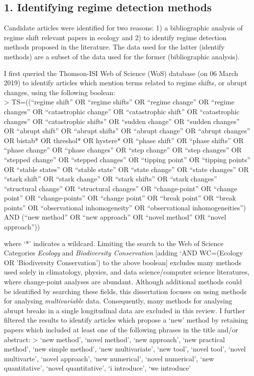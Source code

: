 \documentclass[12pt,twoside,openany]{reedthesis}
\begin{document}
\hypertarget{identifying-regime-detection-methods}{%
\subsection{1. Identifying regime detection methods}\label{identifying-regime-detection-methods}}

Candidate articles were identified for two reasons: 1) a bibliographic analysis of regime shift relevant papers in ecology and 2) to identify regime detection methods proposed in the literature. The data used for the latter (identify methods) are a subset of the data used for the former (bibliographic analysis).

I first queried the Thomson-ISI Web of Science (WoS) database (on 06 March 2019) to identify articles which mention terms related to regime shifts, or abrupt changes, using the following boolean:\\
\textgreater{} TS=((``regime shift'' OR ``regime shifts'' OR ``regime change'' OR ``regime changes'' OR ``catastrophic change'' OR ``catastrophic shift'' OR ``catastrophic changes'' OR ``catastrophic shifts'' OR ``sudden change'' OR ``sudden changes'' OR ``abrupt shift'' OR ``abrupt shifts'' OR ``abrupt change'' OR ``abrupt changes'' OR bistab* OR threshol* OR hystere* OR ``phase shift'' OR ``phase shifts'' OR ``phase change'' OR ``phase changes'' OR ``step change'' OR ``step changes'' OR ``stepped change'' OR ``stepped changes'' OR ``tipping point'' OR ``tipping points'' OR ``stable states'' OR ``stable state'' OR ``state change'' OR ``state changes'' OR ``stark shift'' OR ``stark change'' OR ``stark shifts'' OR ``stark changes'' ``structural change'' OR ``structural changes'' OR ``change-point'' OR ``change point'' OR ``change-points'' OR ``change point'' OR ``break point'' OR ``break points'' OR ``observational inhomogeneity'' OR ``observational inhomogeneities'') AND (``new method'' OR ``new approach'' OR ``novel method'' OR ``novel approach''))

where `*' indicates a wildcard. Limiting the search to the Web of Science Categories \emph{Ecology} and \emph{Biodiversity Conservation} {[}adding `AND WC=(Ecology OR 'Biodiversity Conservation') to the above boolean{]} excludes many methods used solely in climatology, physics, and data science/computer science literatures, where change-point analyses are abundant. Although additional methods could be identified by searching these fields, this dissertation focuses on using methods for analysing \emph{multivariable} data. Consequently, many methods for analysing abrupt breaks in a single longitudinal data are excluded in this review. I further filtered the results to identify articles which propose a `new' method by retaining papers which included at least one of the following phrases in the title and/or abstract:
\textgreater{} `new method', `novel method', `new approach', `new practical method', `new simple method', `new multivariate', `new tool', `novel tool', `novel multivarte', `novel approach', `new numerical', `novel numerical', `new quantitative', `novel quantitative', `i introduce', `we introduce'
\end{document}
